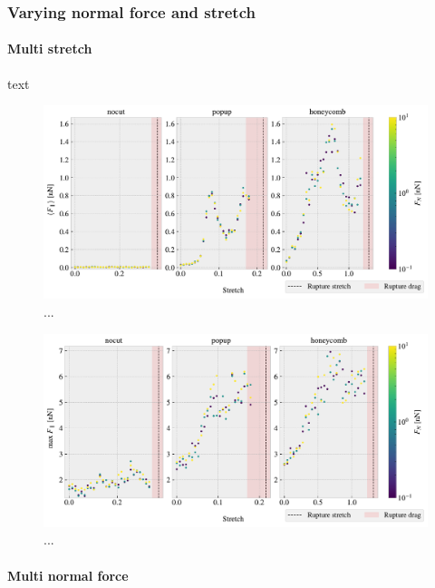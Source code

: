 \newpage
\subsubsection{Varying normal force and stretch}
\paragraph*{Multi stretch} 
text

\begin{figure}[H]
  \centering
  \includegraphics[width=\linewidth]{figures/baseline/multi_stretch_mean_compare.pdf}
  \caption{...}
  \label{fig:}
\end{figure}


\begin{figure}[H]
  \centering
  \includegraphics[width=\linewidth]{figures/baseline/multi_stretch_max_compare.pdf}
  \caption{...}
  \label{fig:}
\end{figure}

\paragraph*{Multi normal force}



